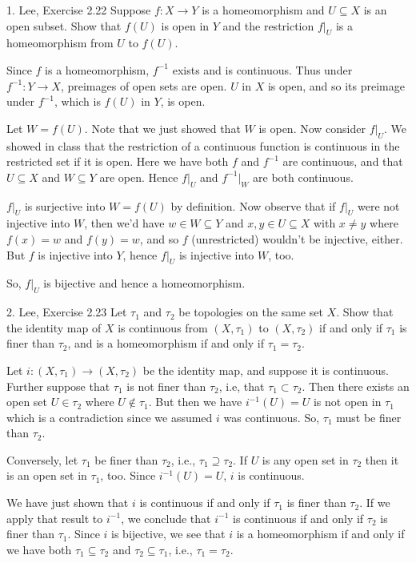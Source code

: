 \documentclass{homework}
\newcommand{\ra}{\rightarrow}
\begin{document}
\begin{exercise}{1. Lee, Exercise 2.22}
Suppose $f:X\ra Y$ is a homeomorphism and $U\subseteq X$ is an open subset.
Show that $f(U)$ is open in $Y$ and the restriction $f|_U$ is a homeomorphism
from $U$ to $f(U)$.
\end{exercise}
\solution
Since $f$ is a homeomorphism, $f^{-1}$ exists and is continuous.  Thus
under $f^{-1}:Y\ra X$, preimages of open sets are open.  $U$ in $X$ is open,
and so its preimage under $f^{-1}$, which is $f(U)$ in $Y$, is open.

Let $W=f(U)$.  Note that we just showed that $W$ is open.
Now consider $f|_U$.
We showed in class that the restriction of a continuous
function is continuous in the restricted set if it is open.  Here we have
both $f$ and $f^{-1}$ are continuous,
and that $U\subseteq X$ and $W\subseteq Y$
are open.  Hence $f|_U$ and $f^{-1}|_W$ are both continuous.

$f|_U$ is surjective into $W=f(U)$ by definition.  Now observe that if
$f|_U$ were not injective into $W$, then we'd have $w\in W\subseteq Y$ and
$x,y\in U\subseteq X$ with $x\ne y$
where $f(x)=w$ and $f(y)=w$,
and so $f$ (unrestricted) wouldn't be injective, either.
But $f$ is injective into $Y$,
hence $f|_U$ is injective into $W$, too.

So, $f|_U$ is bijective and hence a homeomorphism.

\hrulefill
\begin{exercise}{2. Lee, Exercise 2.23}
Let $\tau_1$ and $\tau_2$ be topologies on the same set $X$.  Show that the
identity map of $X$ is continuous from $(X,\tau_1)$ to $(X,\tau_2)$ if and
only if $\tau_1$ is finer than $\tau_2$, and is a homeomorphism if and only
if $\tau_1=\tau_2$.
\end{exercise}
\solution
Let $i:(X,\tau_1)\ra(X,\tau_2)$ be the identity map, and suppose it is continuous.
Further suppose that $\tau_1$ is not finer than $\tau_2$, i.e, that
$\tau_1\subset\tau_2$.
Then there exists an open set $U\in\tau_2$ where $U\not\in\tau_1$.  But
then we have
$i^{-1}(U)=U$ is not open in $\tau_1$ which is a contradiction since we
assumed $i$ was continuous.  So,
$\tau_1$ must be finer than $\tau_2$.

Conversely, let $\tau_1$ be finer than $\tau_2$, i.e., $\tau_1\supseteq\tau_2$.
If $U$ is any open set in $\tau_2$ then it is an open set in $\tau_1$, too.
Since $i^{-1}(U)=U$, $i$ is continuous.

We have just shown that $i$ is continuous if and only if $\tau_1$ is finer
than $\tau_2$.  If we apply that result to $i^{-1}$, we conclude that $i^{-1}$
is continuous if and only if $\tau_2$ is finer than $\tau_1$.  Since $i$ is
bijective, we see that $i$ is a homeomorphism if and only if we have both
 $\tau_1\subseteq\tau_2$ and $\tau_2\subseteq\tau_1$, i.e., $\tau_1=\tau_2$.
\end{document}
